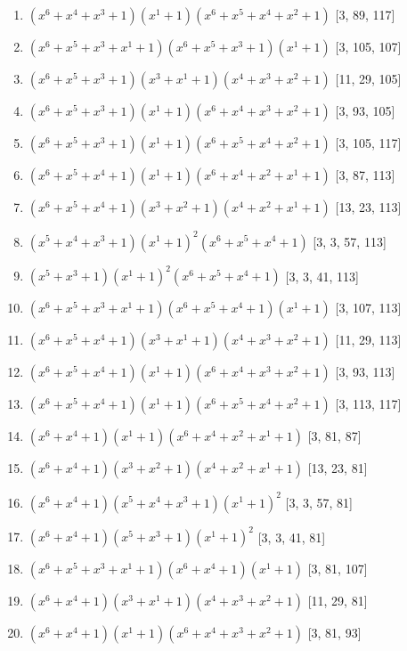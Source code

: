 \documentclass[10pt,twocolumn]{article}
\begin{document}
\begin{enumerate}
\item $(x^{6} + x^{4} + x^{3} + 1)(x^{1} + 1)(x^{6} + x^{5} + x^{4} + x^{2} + 1)$  [3, 89, 117]
\item $(x^{6} + x^{5} + x^{3} + x^{1} + 1)(x^{6} + x^{5} + x^{3} + 1)(x^{1} + 1)$  [3, 105, 107]
\item $(x^{6} + x^{5} + x^{3} + 1)(x^{3} + x^{1} + 1)(x^{4} + x^{3} + x^{2} + 1)$  [11, 29, 105]
\item $(x^{6} + x^{5} + x^{3} + 1)(x^{1} + 1)(x^{6} + x^{4} + x^{3} + x^{2} + 1)$  [3, 93, 105]
\item $(x^{6} + x^{5} + x^{3} + 1)(x^{1} + 1)(x^{6} + x^{5} + x^{4} + x^{2} + 1)$  [3, 105, 117]
\item $(x^{6} + x^{5} + x^{4} + 1)(x^{1} + 1)(x^{6} + x^{4} + x^{2} + x^{1} + 1)$  [3, 87, 113]
\item $(x^{6} + x^{5} + x^{4} + 1)(x^{3} + x^{2} + 1)(x^{4} + x^{2} + x^{1} + 1)$  [13, 23, 113]
\item $(x^{5} + x^{4} + x^{3} + 1)(x^{1} + 1)^{2}(x^{6} + x^{5} + x^{4} + 1)$  [3, 3, 57, 113]
\item $(x^{5} + x^{3} + 1)(x^{1} + 1)^{2}(x^{6} + x^{5} + x^{4} + 1)$  [3, 3, 41, 113]
\item $(x^{6} + x^{5} + x^{3} + x^{1} + 1)(x^{6} + x^{5} + x^{4} + 1)(x^{1} + 1)$  [3, 107, 113]
\item $(x^{6} + x^{5} + x^{4} + 1)(x^{3} + x^{1} + 1)(x^{4} + x^{3} + x^{2} + 1)$  [11, 29, 113]
\item $(x^{6} + x^{5} + x^{4} + 1)(x^{1} + 1)(x^{6} + x^{4} + x^{3} + x^{2} + 1)$  [3, 93, 113]
\item $(x^{6} + x^{5} + x^{4} + 1)(x^{1} + 1)(x^{6} + x^{5} + x^{4} + x^{2} + 1)$  [3, 113, 117]
\item $(x^{6} + x^{4} + 1)(x^{1} + 1)(x^{6} + x^{4} + x^{2} + x^{1} + 1)$  [3, 81, 87]
\item $(x^{6} + x^{4} + 1)(x^{3} + x^{2} + 1)(x^{4} + x^{2} + x^{1} + 1)$  [13, 23, 81]
\item $(x^{6} + x^{4} + 1)(x^{5} + x^{4} + x^{3} + 1)(x^{1} + 1)^{2}$  [3, 3, 57, 81]
\item $(x^{6} + x^{4} + 1)(x^{5} + x^{3} + 1)(x^{1} + 1)^{2}$  [3, 3, 41, 81]
\item $(x^{6} + x^{5} + x^{3} + x^{1} + 1)(x^{6} + x^{4} + 1)(x^{1} + 1)$  [3, 81, 107]
\item $(x^{6} + x^{4} + 1)(x^{3} + x^{1} + 1)(x^{4} + x^{3} + x^{2} + 1)$  [11, 29, 81]
\item $(x^{6} + x^{4} + 1)(x^{1} + 1)(x^{6} + x^{4} + x^{3} + x^{2} + 1)$  [3, 81, 93]

\end{enumerate}
\end{document}
